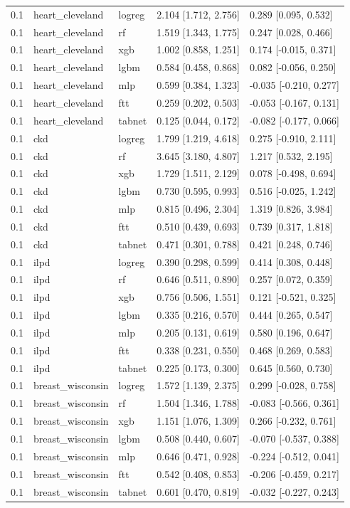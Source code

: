 \begin{table}[t]
\begin{tabular}{lllll}
0.1 & heart\_cleveland & logreg & 2.104 [1.712, 2.756] & 0.289 [0.095, 0.532] \\
0.1 & heart\_cleveland & rf & 1.519 [1.343, 1.775] & 0.247 [0.028, 0.466] \\
0.1 & heart\_cleveland & xgb & 1.002 [0.858, 1.251] & 0.174 [-0.015, 0.371] \\
0.1 & heart\_cleveland & lgbm & 0.584 [0.458, 0.868] & 0.082 [-0.056, 0.250] \\
0.1 & heart\_cleveland & mlp & 0.599 [0.384, 1.323] & -0.035 [-0.210, 0.277] \\
0.1 & heart\_cleveland & ftt & 0.259 [0.202, 0.503] & -0.053 [-0.167, 0.131] \\
0.1 & heart\_cleveland & tabnet & 0.125 [0.044, 0.172] & -0.082 [-0.177, 0.066] \\
0.1 & ckd & logreg & 1.799 [1.219, 4.618] & 0.275 [-0.910, 2.111] \\
0.1 & ckd & rf & 3.645 [3.180, 4.807] & 1.217 [0.532, 2.195] \\
0.1 & ckd & xgb & 1.729 [1.511, 2.129] & 0.078 [-0.498, 0.694] \\
0.1 & ckd & lgbm & 0.730 [0.595, 0.993] & 0.516 [-0.025, 1.242] \\
0.1 & ckd & mlp & 0.815 [0.496, 2.304] & 1.319 [0.826, 3.984] \\
0.1 & ckd & ftt & 0.510 [0.439, 0.693] & 0.739 [0.317, 1.818] \\
0.1 & ckd & tabnet & 0.471 [0.301, 0.788] & 0.421 [0.248, 0.746] \\
0.1 & ilpd & logreg & 0.390 [0.298, 0.599] & 0.414 [0.308, 0.448] \\
0.1 & ilpd & rf & 0.646 [0.511, 0.890] & 0.257 [0.072, 0.359] \\
0.1 & ilpd & xgb & 0.756 [0.506, 1.551] & 0.121 [-0.521, 0.325] \\
0.1 & ilpd & lgbm & 0.335 [0.216, 0.570] & 0.444 [0.265, 0.547] \\
0.1 & ilpd & mlp & 0.205 [0.131, 0.619] & 0.580 [0.196, 0.647] \\
0.1 & ilpd & ftt & 0.338 [0.231, 0.550] & 0.468 [0.269, 0.583] \\
0.1 & ilpd & tabnet & 0.225 [0.173, 0.300] & 0.645 [0.560, 0.730] \\
0.1 & breast\_wisconsin & logreg & 1.572 [1.139, 2.375] & 0.299 [-0.028, 0.758] \\
0.1 & breast\_wisconsin & rf & 1.504 [1.346, 1.788] & -0.083 [-0.566, 0.361] \\
0.1 & breast\_wisconsin & xgb & 1.151 [1.076, 1.309] & 0.266 [-0.232, 0.761] \\
0.1 & breast\_wisconsin & lgbm & 0.508 [0.440, 0.607] & -0.070 [-0.537, 0.388] \\
0.1 & breast\_wisconsin & mlp & 0.646 [0.471, 0.928] & -0.224 [-0.512, 0.041] \\
0.1 & breast\_wisconsin & ftt & 0.542 [0.408, 0.853] & -0.206 [-0.459, 0.217] \\
0.1 & breast\_wisconsin & tabnet & 0.601 [0.470, 0.819] & -0.032 [-0.227, 0.243] \\
\bottomrule
\end{tabular}
\end{table}
